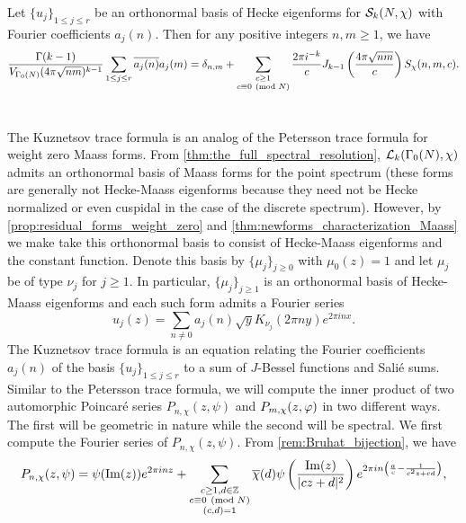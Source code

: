     \begin{theorem}
      Let $\{u_{j}\}_{1 \le j \le r}$ be an orthonormal basis of Hecke eigenforms for $\mathcal{S}_{k}(N,\chi)$ with Fourier coefficients $a_{j}(n)$. Then for any positive integers $n,m \ge 1$, we have
      \[
        \frac{\Gamma(k-1)}{V_{\Gamma_{0}(N)}(4\pi\sqrt{nm})^{k-1}}\sum_{1 \le j \le r}\overline{a_{j}(n)}a_{j}(m) = \delta_{n,m}+\sum_{\substack{c \ge 1 \\ c \equiv 0 \ \left(\text{mod }N\right)}}\frac{2\pi i^{-k}}{c}J_{k-1}\left(\frac{4\pi\sqrt{nm}}{c}\right)S_{\chi}(n,m,c).
      \]
    \end{theorem}
  \section{}
    The Kuznetsov trace formula is an analog of the Petersson trace formula for weight zero Maass forms. From \cref{thm:the_full_spectral_resolution}, $\mathcal{L}_{k}(\Gamma_{0}(N),\chi)$ admits an orthonormal basis of Maass forms for the point spectrum (these forms are generally not Hecke-Maass eigenforms because they need not be Hecke normalized or even cuspidal in the case of the discrete spectrum). However, by \cref{prop:residual_forms_weight_zero} and \cref{thm:newforms_characterization_Maass} we make take this orthonormal basis to consist of Hecke-Maass eigenforms and the constant function. Denote this basis by $\{\mu_{j}\}_{j \ge 0}$ with $\mu_{0}(z) = 1$ and let $\mu_{j}$ be of type $\nu_{j}$ for $j \ge 1$. In particular, $\{\mu_{j}\}_{j \ge 1}$ is an orthonormal basis of Hecke-Maass eigenforms and each such form admits a Fourier series
    \[
      u_{j}(z) = \sum_{n \neq 0}a_{j}(n)\sqrt{y}K_{\nu_{j}}(2\pi ny)e^{2\pi inx}.
    \]
    The Kuznetsov trace formula is an equation relating the Fourier coefficients $a_{j}(n)$ of the basis $\{u_{j}\}_{1 \le j \le r}$ to a sum of $J$-Bessel functions and Sali\'e sums. Similar to the Petersson trace formula, we will compute the inner product of two automorphic Poincar\'e series $P_{n,\chi}(z,\psi)$ and $P_{m,\chi}(z,\varphi)$ in two different ways. The first will be geometric in nature while the second will be spectral. We first compute the Fourier series of $P_{n,\chi}(z,\psi)$. From \cref{rem:Bruhat_bijection}, we have
    \[
      P_{n,\chi}(z,\psi) = \psi(\mathrm{Im}(z))e^{2\pi inz}+\sum_{\substack{c \ge 1, d \in \mathbb{Z} \\ c \equiv 0 \ \left(\text{mod }N\right) \\ (c,d) = 1}}\overline{\chi}(d)\psi\left(\frac{\mathrm{Im}(z)}{|cz+d|^{2}}\right)e^{2\pi in\left(\frac{a}{c}-\frac{1}{c^{2}z+cd}\right)},
    \]
